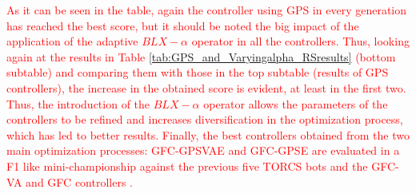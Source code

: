 \documentclass[10pt,journal,compsoc]{IEEEtran}
\begin{document}
%
\textcolor{red}{
As it can be seen in the table, again the controller using GPS in
every generation has reached the best score, but it should be noted the
big impact of the application of the adaptive $BLX-\alpha$ operator in
all the controllers. Thus, looking again at the results in Table \ref{tab:GPS_and_Varyingalpha_RSresults} (bottom subtable) 
and comparing them with those in the top subtable (results of GPS controllers), the increase in the obtained score is evident, at least in the first
two. %
Thus, the introduction of the $BLX-\alpha$ operator allows the parameters of the controllers to be refined and increases diversification in the optimization process, which has led to better results.
Finally, the best controllers obtained from the two main optimization
processes: {\sf GFC-GPSVAE} and {\sf GFC-GPSE} are evaluated in a F1 like
mini-championship against the previous five TORCS bots and the {\sf GFC-VA}\cite{DBLP:conf/cig/SalemMG19} and {\sf GFC} controllers  \cite{salem_cig2018}. 
}
\end{document}
